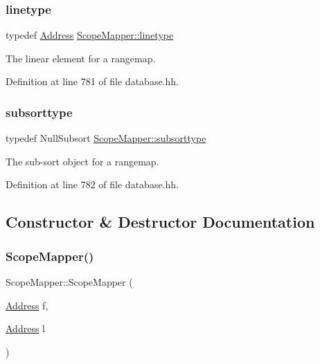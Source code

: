 \subsubsection{\texorpdfstring{linetype}{linetype}}
{\footnotesize\ttfamily typedef \mbox{\hyperlink{class_address}{Address}} \mbox{\hyperlink{class_scope_mapper_abdcc9189429d97c87bd108d85fcc14ea}{Scope\+Mapper\+::linetype}}}



The linear element for a rangemap. 



Definition at line 781 of file database.\+hh.

\mbox{\label{class_scope_mapper_a598c78e0afbef2d73420af20d1045752}} 
\subsubsection{\texorpdfstring{subsorttype}{subsorttype}}
{\footnotesize\ttfamily typedef Null\+Subsort \mbox{\hyperlink{class_scope_mapper_a598c78e0afbef2d73420af20d1045752}{Scope\+Mapper\+::subsorttype}}}



The sub-\/sort object for a rangemap. 



Definition at line 782 of file database.\+hh.



\subsection{Constructor \& Destructor Documentation}
\mbox{\label{class_scope_mapper_a6cab25632b1b02a580131c0bff608916}} 
\subsubsection{\texorpdfstring{ScopeMapper()}{ScopeMapper()}}
{\footnotesize\ttfamily Scope\+Mapper\+::\+Scope\+Mapper (\begin{DoxyParamCaption}\item[{\mbox{\hyperlink{class_address}{Address}}}]{f,  }\item[{\mbox{\hyperlink{class_address}{Address}}}]{l }\end{DoxyParamCaption})\hspace{0.3cm}{\ttfamily [inline]}}



